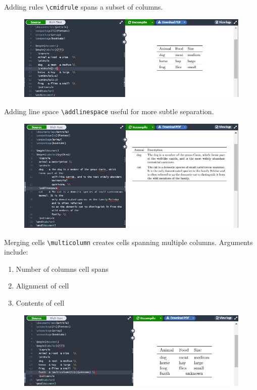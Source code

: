 \documentclass{beamer}
\begin{document}
{  \begin{frame}{Adding rules}
    \texttt{\textbackslash cmidrule} spans a subset of columns.
    \begin{figure}
      \includegraphics[width=0.9\linewidth]{day01-overleaf-11F-table-cmidrule.png}
    \end{figure}
  \end{frame}

  \begin{frame}{Adding line space}
    \texttt{\textbackslash addlinespace} useful for more subtle separation.
    \begin{figure}
      \includegraphics[width=0.9\linewidth]{day01-overleaf-11G-table-linespace.png}
    \end{figure}
  \end{frame}

  \begin{frame}{Merging cells}
    \texttt{\textbackslash multicolumn} creates cells spanning multiple columns. Arguments include:
    \begin{enumerate}
      \item Number of columns cell spans
      \item Alignment of cell
      \item Contents of cell
    \end{enumerate}
    \begin{figure}
      \includegraphics[width=0.9\linewidth]{day01-overleaf-11H-table-merge.png}
    \end{figure}
  \end{frame}

}
\end{document}
